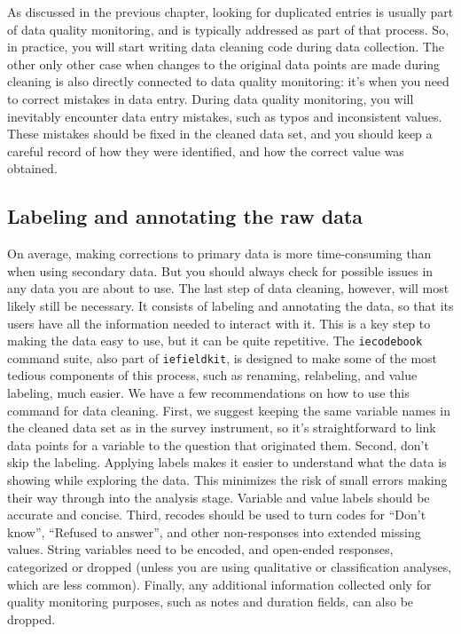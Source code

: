 As discussed in the previous chapter,
looking for duplicated entries is usually part of data quality monitoring,
and is typically addressed as part of that process.
So, in practice, you will start writing data cleaning code during data collection.
The other only other case when changes to the original data points are made during cleaning
is also directly connected to data quality monitoring:
it's when you need to correct mistakes in data entry.
During data quality monitoring, you will inevitably encounter data entry mistakes,
such as typos and inconsistent values.
These mistakes should be fixed in the cleaned data set,
and you should keep a careful record of how they were identified,
and how the correct value was obtained.

\subsection{Labeling and annotating the raw data}

On average, making corrections to primary data is more time-consuming than when using secondary data.
But you should always check for possible issues in any data you are about to use.
The last step of data cleaning, however, will most likely still be necessary.
It consists of labeling and annotating the data, so that its users have all the 
information needed to interact with it.
This is a key step to making the data easy to use, but it can be quite repetitive.
The \texttt{iecodebook} command suite, also part of \texttt{iefieldkit},
is designed to make some of the most tedious components of this process,
such as renaming, relabeling, and value labeling, much easier.
We have a few recommendations on how to use this command for data cleaning.
First, we suggest keeping the same variable names in the cleaned data set as in the survey instrument, so it's straightforward to link data points for a variable to the question that originated them.
Second, don't skip the labeling.
Applying labels makes it easier to understand what the data is showing while exploring the data. 
This minimizes the risk of small errors making their way through into the analysis stage.
Variable and value labels should be accurate and concise.
Third, recodes should be used to turn codes for ``Don't know'', ``Refused to answer'', and
other non-responses into extended missing values.
String variables need to be encoded, and open-ended responses, categorized or dropped
(unless you are using qualitative or classification analyses, which are less common).
Finally, any additional information collected only for quality monitoring purposes,
such as notes and duration fields, can also be dropped.

